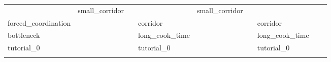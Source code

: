 \begin{table}[t]
\begin{center}
\begin{tabular}{lll|lll|lll}
&
        small\_corridor
           &  
           &  
&
        small\_corridor
           &  
           &  
\\
        forced\_coordination
           &  
           &  
&
        corridor
           &  
           &  
&
        corridor
           &  
           &  
\\
        bottleneck
           &  
           &  
&
        long\_cook\_time
           &  
           &  
&
        long\_cook\_time
           &  
           &  
\\
        tutorial\_0
           &  
           &  
&
        tutorial\_0
           &  
           &  
&
        tutorial\_0
           &  
           &  
\\
&
&
\\
\end{tabular}
\end{center}
\label{T:mapgroups}
\end{table}
